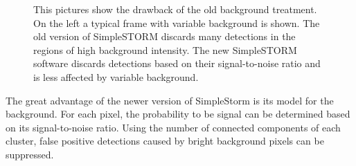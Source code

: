 \begin{figure}
\hfill
{}\hfill	
{}

\caption{This pictures show the drawback of the old background treatment. On the left a typical frame with variable background is shown. The old version of SimpleSTORM discards many detections in the regions of high background intensity. The new SimpleSTORM software discards detections based on their signal-to-noise ratio and is less affected by variable background.}
\label{bgmakesitbad}	

\end{figure}

The great advantage of the newer version of SimpleStorm is its model for the background. For each pixel, the probability to be signal can be determined based on its signal-to-noise ratio. Using the number of connected components of each cluster, false positive detections caused by bright background pixels can be suppressed.

